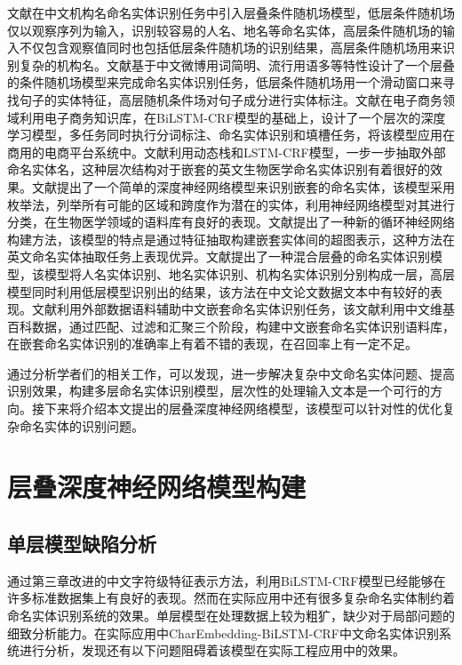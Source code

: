 \documentclass[winfonts,master,oneside,nobackinfo]{njuthesis}
\begin{document}
文献\cite{junsheng}在中文机构名命名实体识别任务中引入层叠条件随机场模型，低层条件随机场仅以观察序列为输入，识别较容易的人名、地名等命名实体，高层条件随机场的输入不仅包含观察值同时也包括低层条件随机场的识别结果，高层条件随机场用来识别复杂的机构名。文献\cite{Yixue}基于中文微博用词简明、流行用语多等特性设计了一个层叠的条件随机场模型来完成命名实体识别任务，低层条件随机场用一个滑动窗口来寻找句子的实体特征，高层随机条件场对句子成分进行实体标注。文献\cite{taobao}在电子商务领域利用电子商务知识库，在BiLSTM-CRF模型的基础上，设计了一个层次的深度学习模型，多任务同时执行分词标注、命名实体识别和填槽任务，将该模型应用在商用的电商平台系统中。文献\cite{Meizhi}利用动态栈和LSTM-CRF模型，一步一步抽取外部命名实体名，这种层次结构对于嵌套的英文生物医学命名实体识别有着很好的效果。文献\cite{Mohammad}提出了一个简单的深度神经网络模型来识别嵌套的命名实体，该模型采用枚举法，列举所有可能的区域和跨度作为潜在的实体，利用神经网络模型对其进行分类，在生物医学领域的语料库有良好的表现。文献\cite{Arzoo}提出了一种新的循环神经网络构建方法，该模型的特点是通过特征抽取构建嵌套实体间的超图表示，这种方法在英文命名实体抽取任务上表现优异。文献\cite{Jia}提出了一种混合层叠的命名实体识别模型，该模型将人名实体识别、地名实体识别、机构名实体识别分别构成一层，高层模型同时利用低层模型识别出的结果，该方法在中文论文数据文本中有较好的表现。文献\cite{yanqun}利用外部数据语料辅助中文嵌套命名实体识别任务，该文献利用中文维基百科数据，通过匹配、过滤和汇聚三个阶段，构建中文嵌套命名实体识别语料库，在嵌套命名实体识别的准确率上有着不错的表现，在召回率上有一定不足。

通过分析学者们的相关工作，可以发现，进一步解决复杂中文命名实体问题、提高识别效果，构建多层命名实体识别模型，层次性的处理输入文本是一个可行的方向。接下来将介绍本文提出的层叠深度神经网络模型，该模型可以针对性的优化复杂命名实体的识别问题。

\section{层叠深度神经网络模型构建}

\subsection{单层模型缺陷分析}

通过第三章改进的中文字符级特征表示方法，利用BiLSTM-CRF模型已经能够在许多标准数据集上有良好的表现。然而在实际应用中还有很多复杂命名实体制约着命名实体识别系统的效果。单层模型在处理数据上较为粗犷，缺少对于局部问题的细致分析能力。在实际应用中CharEmbedding-BiLSTM-CRF中文命名实体识别系统进行分析，发现还有以下问题阻碍着该模型在实际工程应用中的效果。
\end{document}
